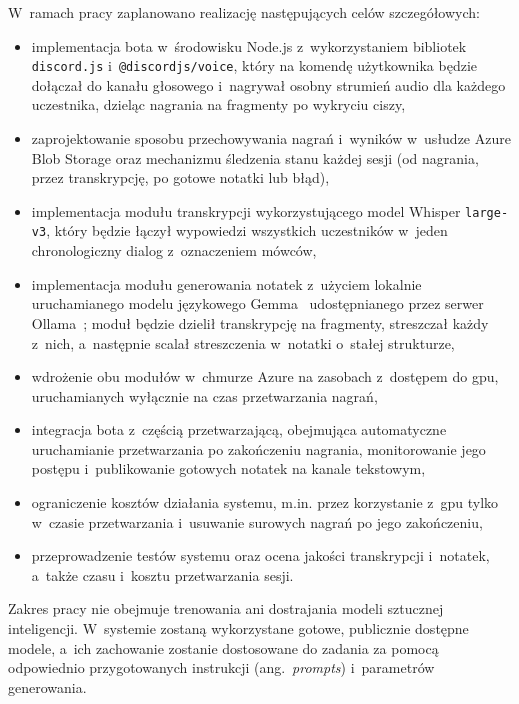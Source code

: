 W~ramach pracy zaplanowano realizację następujących celów szczegółowych:
\begin{itemize}
  \item implementacja bota w~środowisku Node.js z~wykorzystaniem bibliotek
        \texttt{discord.js} i~\texttt{@discordjs/voice}, który na komendę
        użytkownika będzie dołączał do kanału głosowego i~nagrywał osobny
        strumień audio dla każdego uczestnika, dzieląc nagrania na fragmenty po
        wykryciu ciszy,
  \item zaprojektowanie sposobu przechowywania nagrań i~wyników w~usłudze
        Azure Blob Storage oraz mechanizmu śledzenia stanu każdej sesji
        (od nagrania, przez transkrypcję, po gotowe notatki lub błąd),
  \item implementacja modułu transkrypcji wykorzystującego model
        Whisper \texttt{large-v3}, który będzie łączył wypowiedzi wszystkich
        uczestników w~jeden chronologiczny dialog z~oznaczeniem mówców,
  \item implementacja modułu generowania notatek z~użyciem lokalnie
        uruchamianego modelu językowego Gemma~\cite{Gemma} udostępnianego przez
        serwer Ollama~\cite{Ollama}; moduł będzie dzielił transkrypcję na
        fragmenty, streszczał każdy z~nich, a~następnie scalał streszczenia
        w~notatki o~stałej strukturze,
  \item wdrożenie obu modułów w~chmurze Azure na zasobach z~dostępem do
        \acs{gpu}, uruchamianych wyłącznie na czas przetwarzania nagrań,
  \item integracja bota z~częścią przetwarzającą, obejmująca automatyczne
        uruchamianie przetwarzania po zakończeniu nagrania, monitorowanie jego
        postępu i~publikowanie gotowych notatek na kanale tekstowym,
  \item ograniczenie kosztów działania systemu, m.in. przez korzystanie z~\acs{gpu}
        tylko w~czasie przetwarzania i~usuwanie surowych nagrań po jego
        zakończeniu,
  \item przeprowadzenie testów systemu oraz ocena jakości transkrypcji
        i~notatek, a~także czasu i~kosztu przetwarzania sesji.
\end{itemize}

Zakres pracy nie obejmuje trenowania ani dostrajania modeli sztucznej
inteligencji. W~systemie zostaną wykorzystane gotowe, publicznie dostępne
modele, a~ich zachowanie zostanie dostosowane do zadania za pomocą odpowiednio
przygotowanych instrukcji (ang.~\textit{prompts}) i~parametrów generowania.

